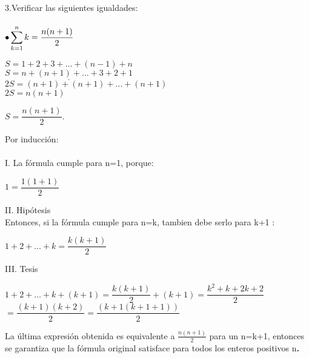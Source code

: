 \documentclass[12pt,a4paper,scrartcl]{article}
\begin{document}
\newpage
3.Verificar las siguientes igualdades:\\
\\
$
\displaystyle\bullet
\sum_{k=1}^{n}k = \dfrac{n(n+1)}{2} \\
$
\begin{center}
$S=1+2+3+\ldots+(n-1)+n$\\$\underline{S=n+(n+1)+\ldots+3+2+1}$\\$2S=(n+1)+(n+1)+\ldots+(n+1)$\\\vspace{1em}
$2S=n(n+1)$\\\vspace{1em}
\begin{center}
$S=\dfrac{n(n+1)}{2}\textbf{.}$
\end{center}
\end{center}Por inducci\'on:\\
\\I. La f\'ormula cumple para n=1, porque:\\
\begin{center}
$1=\dfrac{1(1+1)}{2}$
\end{center}
II. Hip\'otesis\\Entonces, si la f\'ormula cumple para n=k, tambien debe serlo para k+1 :
\begin{center}
$1+2+\ldots+k=\dfrac{k(k+1)}{2}$\\
\end{center}
III. Tesis\\
\begin{center}
$1+2+\ldots+k+(k+1) = \dfrac{k(k+1)}{2}+(k+1) = \dfrac{k^2+k+2k+2}{2}$\\\vspace{1em}$=\dfrac{(k+1)(k+2)}{2} = \dfrac{(k+1(k+1+1))}{2}$
\end{center}
La \'ultima expresi\'on obtenida es equivalente a $\frac{n(n+1)}{2}$  para un n=k+1, entonces se garantiza que la f\'ormula original satisface para todos los enteros positivos n\textbf{.}
\end{document}
